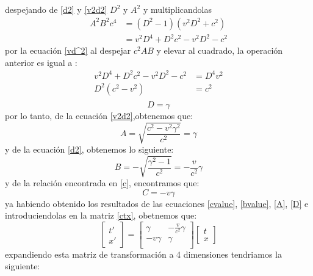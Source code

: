 \documentclass[12pt,letterpaper]{report}
\begin{document}
despejando de \ref{d2} y \ref{v2d2} $D^2$ y $A^2$ y multiplicandolas
\begin{align*}
    A^2 B^2 c^4 &= (D^2-1)(v^2 D^2 + c^2 )\\
                &=v^2D^4+D^2 c^2 -v^2 D^2 -c^2
\end{align*}
por la ecuación \ref{vd^2} al despejar $c^2AB$ y elevar al cuadrado, la operación anterior es igual a :
\begin{align*}
    v^2D^4+D^2 c^2 -v^2 D^2 -c^2&= D^4 v^2 \\
    D^2(c^2-v^2)&=c^2\\
\end{align*}
\begin{equation}
    D = \gamma  \label{D}
\end{equation}
por lo tanto, de la ecuación \ref{v2d2},obtenemos que:
\begin{equation}
    A= \sqrt{\frac{c^2-v^2 \gamma^2}{c^2}} = \gamma
    \label{A}
\end{equation}
y de la ecuación \ref{d2}, obtenemos lo siguiente:
\begin{equation}
    B= -\sqrt{\frac{\gamma^2-1}{c^2}} = -\frac{v}{c^2} \gamma
    \label{bvalue}
\end{equation}
y de la relación encontrada en \ref{c}, encontramos que:
\begin{equation}
    C=  -v \gamma
    \label{cvalue}
\end{equation}
ya habiendo obtenido los resultados de las ecuaciones \ref{cvalue}, \ref{bvalue}, \ref{A}, \ref{D} e introduciendolas en la matriz \ref{ctx}, obetnemos que:
\begin{equation}
    \begin{bmatrix}
        {t}'\\
        x' 
    \end{bmatrix}= 
    \begin{bmatrix}
        \gamma & -\frac{v}{c^2}\gamma \\
        -v\gamma & \gamma\\
    \end{bmatrix} \begin{bmatrix}
        t \\
        x
    \end{bmatrix}
    \label{ctx3}
\end{equation}
expandiendo esta matriz de transformación a 4 dimensiones tendriamos la siguiente:
\end{document}
